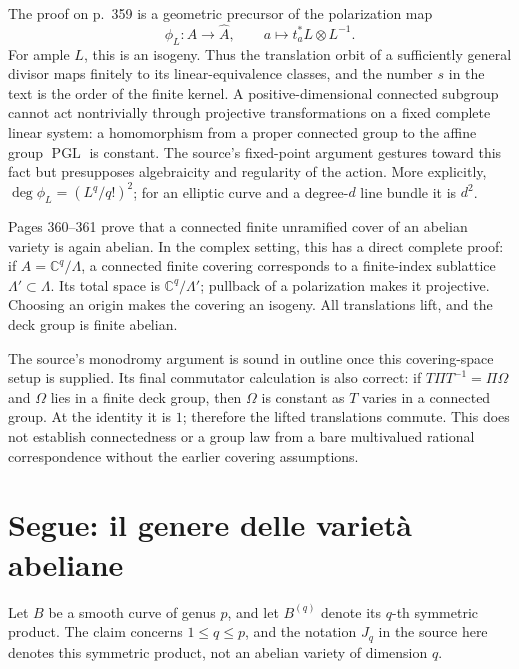The proof on p.~359 is a geometric precursor of the polarization map
\[
\phi_L:A\longrightarrow\widehat A,\qquad
a\longmapsto t_a^*L\otimes L^{-1}.
\]
For ample \(L\), this is an isogeny. Thus the translation orbit of a sufficiently general divisor maps finitely to its linear-equivalence classes, and the number \(s\) in the text is the order of the finite kernel. A positive-dimensional connected subgroup cannot act nontrivially through projective transformations on a fixed complete linear system: a homomorphism from a proper connected group to the affine group \(\operatorname{PGL}\) is constant. The source's fixed-point argument gestures toward this fact but presupposes algebraicity and regularity of the action. More explicitly, \(\deg\phi_L=(L^q/q!)^2\); for an elliptic curve and a degree-\(d\) line bundle it is \(d^2\).

Pages 360--361 prove that a connected finite unramified cover of an abelian variety is again abelian. In the complex setting, this has a direct complete proof: if \(A=\mathbb C^q/\Lambda\), a connected finite covering corresponds to a finite-index sublattice \(\Lambda'\subset\Lambda\). Its total space is \(\mathbb C^q/\Lambda'\); pullback of a polarization makes it projective. Choosing an origin makes the covering an isogeny. All translations lift, and the deck group is finite abelian.

The source's monodromy argument is sound in outline once this covering-space setup is supplied. Its final commutator calculation is also correct: if \(T\Pi T^{-1}=\Pi\Omega\) and \(\Omega\) lies in a finite deck group, then \(\Omega\) is constant as \(T\) varies in a connected group. At the identity it is \(1\); therefore the lifted translations commute. This does not establish connectedness or a group law from a bare multivalued rational correspondence without the earlier covering assumptions.



\section{Segue: il genere delle varietà abeliane}\label{cp2-ix-10}

Let \(B\) be a smooth curve of genus \(p\), and let \(B^{(q)}\) denote its \(q\)-th symmetric product. The claim concerns \(1\leq q\leq p\), and the notation \(J_q\) in the source here denotes this symmetric product, not an abelian variety of dimension \(q\).

